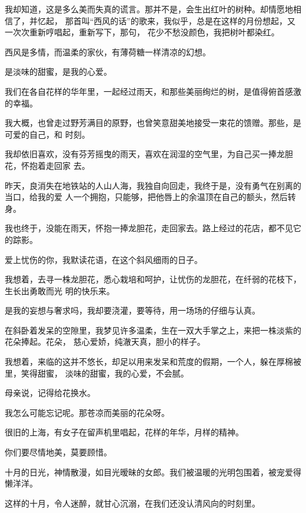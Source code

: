 		我却知道，这是多么美而失真的谎言。那并不是，会生出红叶的树种。却情愿地相信了，并忆起，
	那首叫“西风的话”的歌来，我似乎，总是在这样的月份想起，又一次次重新哼唱起，重新写下，那句，
	花少不愁没颜色，我把树叶都染红。

		西风是多情，而温柔的家伙，有薄荷糖一样清凉的幻想。

		是淡味的甜蜜，是我的心爱。

		我们在各自花样的华年里，一起经过雨天，和那些美丽绚烂的树，是值得俯首感激的幸福。


		我大概，也曾走过野芳满目的原野，也曾笑意甜美地接受一束花的馈赠。那些，是可爱的自己，和
	时刻。

		我却依旧喜欢，没有芬芳摇曳的雨天，喜欢在润湿的空气里，为自己买一捧龙胆花，怀抱着走回家
	去。

		昨天，良消失在地铁站的人山人海，我独自向回走，我终于是，没有勇气在别离的当口，给我的爱
	人一个拥抱，只能够，把他唇上的余温顶在自己的额头，然后转身。

		我也终于，没能在雨天，怀抱一捧龙胆花，走回家去。路上经过的花店，都不见它的踪影。

		爱上忧伤的你，我默读花语，在这个斜风细雨的日子。

		我想着，去寻一株龙胆花，悉心栽培和呵护，让忧伤的龙胆花，在纤弱的花枝下，生长出勇敢而光
	明的快乐来。

		是我的妄想与奢求吗，我却要浇灌，要等待，用一场场的仔细与认真。

		\vspace{1em}

		在斜卧着发呆的空隙里，我梦见许多温柔，生在一双大手掌之上，来把一株淡紫的花朵捧起。花朵，
	慈心爱娇，纯澈天真，胆小的样子。

		我想着，来临的这并不悠长，却足以用来发呆和荒度的假期，一个人，躲在厚棉被里，笑得甜蜜，
	淡味的甜蜜，我的心爱，不会腻。


		母亲说，记得给花换水。

		我怎么可能忘记呢。那苍凉而美丽的花朵呀。

		很旧的上海，有女子在留声机里唱起，花样的年华，月样的精神。


		你们要尽情地美，莫要顾惜。

	\endwriting



		十月的日光，神情散漫，如目光暧昧的女郎。我们被温暖的光明包围着，被宠爱得懒洋洋。

		这样的十月，令人迷醉，就甘心沉溺，在我们还没认清风向的时刻里。

